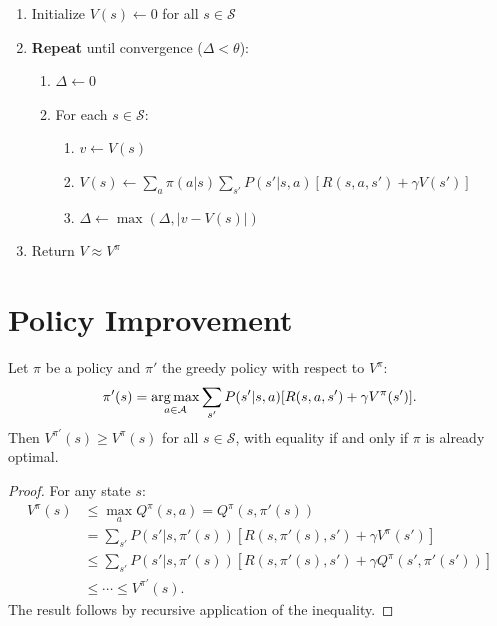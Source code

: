 \begin{algorithme}[title=\textbf{Iterative Policy Evaluation}]
\begin{enumerate}
    \item Initialize $V(s) \leftarrow 0$ for all $s \in \mathcal{S}$
    \item \textbf{Repeat} until convergence ($\Delta < \theta$):
    \begin{enumerate}
        \item $\Delta \leftarrow 0$
        \item For each $s \in \mathcal{S}$:
        \begin{enumerate}
            \item $v \leftarrow V(s)$
            \item $V(s) \leftarrow \sum_a \pi(a|s) \sum_{s'} P(s'|s,a)[R(s,a,s') + \gamma V(s')]$
            \item $\Delta \leftarrow \max(\Delta, |v - V(s)|)$
        \end{enumerate}
    \end{enumerate}
    \item Return $V \approx V^\pi$
\end{enumerate}
\end{algorithme}

\section{Policy Improvement}

\begin{theorem}
\label{thm:policy_improvement}
Let $\pi$ be a policy and $\pi'$ the greedy policy with respect to $V^\pi$:
\[
    \pi'(s) = \operatorname*{arg\,max}_{a \in \mathcal{A}} \sum_{s'} P(s'|s,a)[R(s,a,s') + \gamma V^\pi(s')].
\]
Then $V^{\pi'}(s) \geq V^\pi(s)$ for all $s \in \mathcal{S}$, with equality
if and only if $\pi$ is already optimal.
\end{theorem}

\begin{proof}
For any state $s$:
\begin{align*}
    V^\pi(s) &\leq \max_a Q^\pi(s,a) = Q^\pi(s, \pi'(s)) \\
    &= \sum_{s'} P(s'|s,\pi'(s))[R(s,\pi'(s),s') + \gamma V^\pi(s')] \\
    &\leq \sum_{s'} P(s'|s,\pi'(s))[R(s,\pi'(s),s') + \gamma Q^\pi(s',\pi'(s'))] \\
    &\leq \cdots \leq V^{\pi'}(s).
\end{align*}
The result follows by recursive application of the inequality.
\end{proof}

